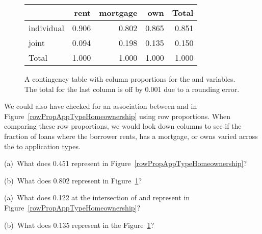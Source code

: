 \begin{figure}[h]
\centering%
\begin{tabular}{l rrr r}
  \hline
  & rent & mortgage & own & Total \\
  \hline
  individual &
      0.906 &
      0.802 &
      0.865 &
      0.851 \\
  joint &
      0.094 &
      0.198 &
      0.135 &
      0.150 \\
  \hline
  Total & 1.000 & 1.000 & 1.000 & 1.000 \\
  \hline
\end{tabular}
\caption{A contingency table with column proportions for the
     and 
    variables.
    The total for the last column is off by 0.001 due
    to a rounding error.}
\label{colPropAppTypeHomeownership}
\end{figure}

We could also have checked for an association between  and  in Figure~\ref{rowPropAppTypeHomeownership} using row proportions. When comparing these row proportions, we would look down columns to see if the fraction of loans where the borrower rents, has a mortgage, or owns varied across the  to  application types.

\begin{exercisewrap}
\begin{nexercise}
(a)~What does 0.451 represent in
Figure~\ref{rowPropAppTypeHomeownership}?

(b)~What does 0.802 represent in
Figure~\ref{colPropAppTypeHomeownership}?\footnotemark{}
\end{nexercise}
\end{exercisewrap}

\begin{exercisewrap}
\begin{nexercise}
(a)~What does 0.122 at the intersection of  and
 represent in
Figure~\ref{rowPropAppTypeHomeownership}?

(b)~What does 0.135 represent in the
Figure~\ref{colPropAppTypeHomeownership}?\footnotemark{}
\end{nexercise}
\end{exercisewrap}

